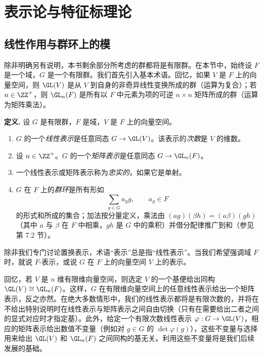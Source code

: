 

\chapter{表示论与特征标理论}

\section{线性作用与群环上的模}

除非明确另有说明，本书剩余部分所考虑的群都将是有限群。在本节中，始终设 $F$ 是一个域，$G$ 是一个有限群。我们首先引入基本术语。回忆，如果 $V$ 是 $F$ 上的向量空间，则 $\GL(V)$ 是从 $V$ 到自身的非奇异线性变换所成的群（运算为复合）；若 $n\in\ZZ^+$，则 $\GL_n(F)$ 是所有以 $F$ 中元素为项的可逆 $n\times n$ 矩阵所成的群（运算为矩阵乘法）。

\noindent\textbf{定义.} 设 $G$ 是有限群，$F$ 是域，$V$ 是 $F$ 上的向量空间。
\begin{enumerate}[label=(\arabic*)]
  \item $G$ 的一个\emph{线性表示}是任意同态 $G\to\GL(V)$。该表示的\emph{次数}是 $V$ 的维数。
  \item 设 $n\in\ZZ^+$。$G$ 的一个\emph{矩阵表示}是任意同态 $G\to\GL_n(F)$。
  \item 一个线性表示或矩阵表示称为\emph{忠实的}，如果它是单射。
  \item $G$ 在 $F$ 上的\emph{群环}是所有形如
  \[
    \sum_{g\in G} a_g g,\qquad a_g\in F
  \]
  的形式和所成的集合；加法按分量定义，乘法由 $(ag)(\beta h)=(a\beta)(gh)$（其中 $a$ 与 $\beta$ 在 $F$ 中相乘，$gh$ 是 $G$ 中的乘积）并借分配律推广到和（参见第 7.2 节）。
\end{enumerate}

除非我们专门讨论置换表示，术语“表示”总是指“线性表示”。当我们希望强调域 $F$ 时，就说 $F$-表示，或说 $G$ 在 $F$ 上的向量空间 $V$ 上的表示。

回忆，若 $V$ 是 $n$ 维有限维向量空间，则选定 $V$ 的一个基便给出同构 $\GL(V)\cong\GL_n(F)$。这样，$G$ 在有限维向量空间上的任意线性表示给出一个矩阵表示，反之亦然。在绝大多数情形中，我们的线性表示都将是有限次数的，并将在不给出特别说明时在线性表示与矩阵表示之间自由切换（只有在需要给出二者之间的显式对应时才指定基）。此外，给定一个有限次数线性表示 $\varphi:G\to\GL(V)$，相应的矩阵表示给出数值不变量（例如对 $g\in G$ 的 $\det\varphi(g)$），这些不变量与选择用来给出 $\GL(V)$ 和 $\GL_n(F)$ 之间同构的基无关。利用这些不变量将是我们后续发展的基础。

